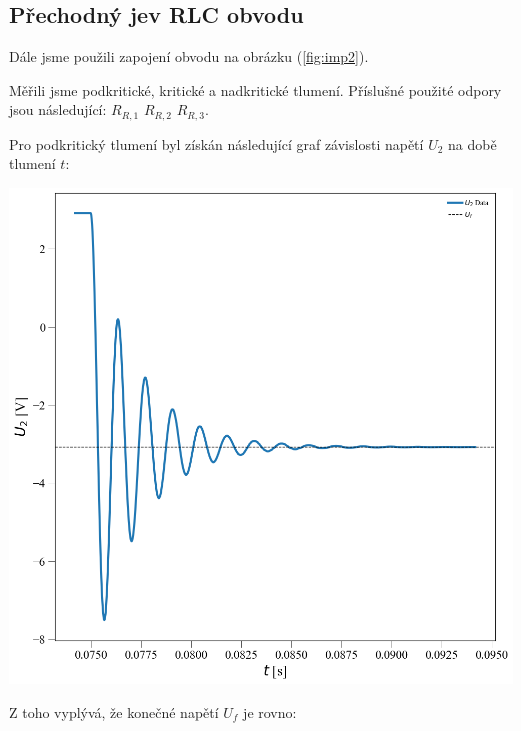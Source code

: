 \documentclass[a4paper,11pt]{article}
\begin{document}
\begin{minipage}[t]{0.5\textwidth} 
            \subsection{Přechodný jev RLC obvodu}
                Dále jsme použili zapojení obvodu na obrázku (\ref{fig:imp2}). 
                \par Měřili jsme podkritické, kritické a nadkritické tlumení. Příslušné použité odpory jsou následující: $R_{R,1}$ $R_{R,2}$ $R_{R,3}$.
                \par Pro podkritický tlumení byl získán následující graf závislosti napětí $U_2$ na době tlumení $t$: 
                \par \centering
                \vspace{10pt}
                \includegraphics[scale=0.3]{pod_krit}
                \captionsetup{justification=centering, font=footnotesize}
                \label{fig:pod_krit}
                \raggedright
                \vspace{10pt}
                \par Z toho vyplývá, že konečné napětí $U_f$ je rovno: 
                \begin{center}

\end{center}
\end{minipage}
\end{document}
